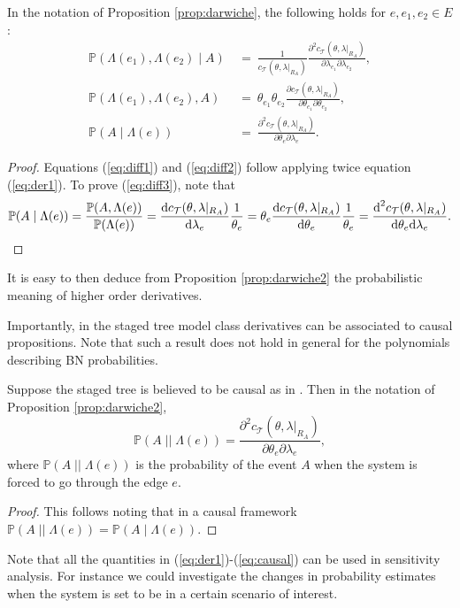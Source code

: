 {\begin{proposition} \label{prop:darwiche2}
In the notation of Proposition \ref{prop:darwiche}, the following holds for $e,e_1, e_2\in E$:
\begin{align}
\mathbb{P}(\Lambda(e_1),\Lambda(e_2)\;|\; A)&~=~ \frac{1}{c_\mathcal{T}(\theta,\lambda|_{R_A})}\frac{\partial^2 c_\mathcal{T}(\theta,\lambda|_{R_A})}{\partial \lambda_{e_1}\partial\lambda_{e_2}}, \label{eq:diff1}\\
\mathbb{P}(\Lambda(e_1),\Lambda(e_2),A)&~=~\theta_{e_1}\theta_{e_2}\frac{\partial c_\mathcal{T}(\theta,\lambda|_{R_A})}{\partial \theta_{e_1}\partial \theta_{e_2}},\label{eq:diff2}\\
\mathbb{P}(A\;|\; \Lambda(e))&~=~\frac{\partial^2 c_\mathcal{T}(\theta,\lambda|_{R_A})}{\partial \theta_e \partial \lambda_e}.\label{eq:diff3} 
\end{align}
\end{proposition}
\begin{proof}
Equations (\ref{eq:diff1}) and (\ref{eq:diff2}) follow applying twice equation (\ref{eq:der1}). To prove (\ref{eq:diff3}), note that
\[
\mathbb{P}(A\;|\;\Lambda(e))=\frac{\mathbb{P}(A,\Lambda(e))}{\mathbb{P}(\Lambda(e))}=\frac{\textnormal{d} c_\mathcal{T}(\theta,\lambda|_{R_A})}{\textnormal{d} \lambda_e}\frac{1}{\theta_e}=\theta_e\frac{\textnormal{d} c_\mathcal{T}(\theta,\lambda|_{R_A})}{\textnormal{d} \theta_e}\frac{1}{\theta_e}=\frac{\textnormal{d}^2c_\mathcal{T}(\theta,\lambda|_{R_A})}{\textnormal{d} \theta_e \textnormal{d} \lambda_e}.
\]
\end{proof}
It is easy to then deduce from Proposition \ref{prop:darwiche2} the probabilistic meaning of higher order derivatives.

Importantly, in the staged tree model class derivatives can be associated to causal propositions. Note that such a result does not hold in general for the polynomials describing BN probabilities. 

\begin{proposition}
Suppose the staged tree is believed to be causal as in \citet{Thwaites2010}. Then in the notation of Proposition \ref{prop:darwiche2},
\begin{equation}
\label{eq:causal}
\mathbb{P}(A\;||\; \Lambda(e))=\frac{\partial^2 c_\mathcal{T}(\theta,\lambda|_{R_A})}{\partial \theta_e \partial \lambda_e},
\end{equation}
where $\mathbb{P}(A\;||\; \Lambda(e))$ is the probability of the event $A$ when the system is forced to go through the edge $e$.
\end{proposition}
\begin{proof}
This follows noting that in a causal framework $\mathbb{P}(A\;||\; \Lambda(e))=\mathbb{P}(A\;|\; \Lambda(e))$.
\end{proof}
Note that all the quantities in (\ref{eq:der1})-(\ref{eq:causal}) can be used in sensitivity analysis. For instance we could investigate the changes in probability estimates when the system is set to be in a certain scenario of interest.

}
